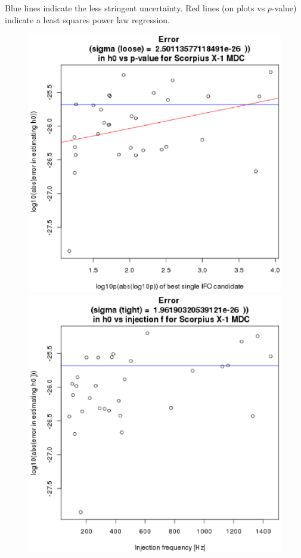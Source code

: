 Blue lines indicate the less stringent uncertainty. Red lines (on plots vs $p$-value) indicate a least squares power law regression.

\begin{figure}
\begin{center}
\includegraphics[width=0.3\paperwidth,height=0.2\paperheight]{Errorh0.eps}
\includegraphics[width=0.3\paperwidth,height=0.2\paperheight]{Errorh0vsF.eps}

\end{center}
\end{figure}
